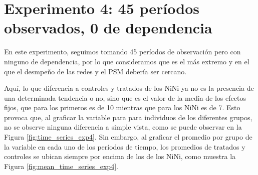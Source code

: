 \documentclass[../../main.tex]{subfiles}
\begin{document}
\section{Experimento 4: 45 períodos observados, 0 de dependencia} \label{sec:exp4}
En este experimento, seguimos tomando 45 períodos de observación pero con ninguno de
dependencia, por lo que consideramos que es el más extremo y en el que el desmpeño de las
redes y el PSM debería ser cercano.

Aquí, lo que diferencia a controles y tratados de los NiNi ya no es la presencia de una
determinada tendencia o no, sino que es el valor de la media de los efectos fijos,
que para los primeros es de 10 mientras que para los NiNi es de 7. Esto provoca que, al
graficar la variable para para individuos de los diferentes grupos, no se observe ninguna
diferencia a simple vista, como se puede observar en la Figura \ref{fig:time_series_exp4}.
Sin embargo, al graficar el promedio por grupo de la variable en cada uno de los períodos
de tiempo, los promedios de tratados y controles se ubican siempre por encima de los de
los NiNi, como muestra la Figura \ref{fig:mean_time_series_exp4}.
\end{document}
